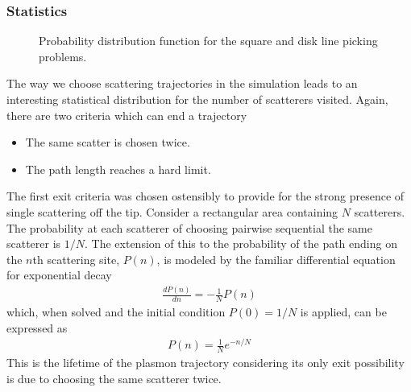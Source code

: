 \subsubsection{Statistics}
\begin{figure}[ht]
\centering
\caption{Probability distribution function for the square and disk line
picking problems.}
\label{fig:linepickingpdf}
\end{figure}
The way we choose scattering trajectories in the simulation leads to an
interesting statistical distribution for the number of scatterers visited.
Again, there are two criteria which can end a trajectory
\begin{itemize}
\item The same scatter is chosen twice.
\item The path length reaches a hard limit.
\end{itemize}
The first exit criteria was chosen ostensibly to provide for the strong
presence of single scattering off the tip.  Consider a rectangular area
containing $N$ scatterers.  The probability at each scatterer of choosing
pairwise sequential the same scatterer is $1/N$.  The extension of this to
the probability of the path ending on the $n$th scattering site, $P(n)$, is
modeled by the familiar differential equation for exponential decay
\begin{align}
\frac{d P(n)}{dn} = -\frac{1}{N}P(n)
\end{align}
which, when solved and the initial condition $P(0)=1/N$ is applied, can be
expressed as
\begin{align}
P(n)=\frac{1}{N}e^{-n/N}
\end{align}
This is the lifetime of the plasmon trajectory considering its only exit
possibility is due to choosing the same scatterer twice.

